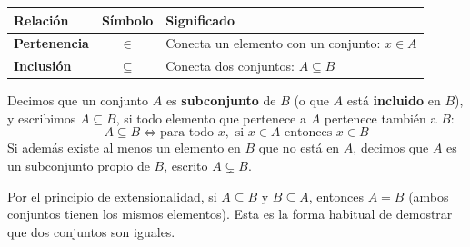 \begin{center}
\begin{tabular}{|l|c|l|}
\hline
\textbf{Relación} & \textbf{Símbolo} & \textbf{Significado} \\
\hline
\textbf{Pertenencia} & $\in$ & Conecta un elemento con un conjunto: $x \in A$ \\
\textbf{Inclusión} & $\subseteq$ & Conecta dos conjuntos: $A \subseteq B$ \\
\hline
\end{tabular}
\end{center}

\begin{definicion}[Subconjunto]
Decimos que un conjunto $A$ es \textbf{subconjunto} de $B$ (o que $A$ está \textbf{incluido} en $B$), y escribimos $A \subseteq B$, si todo elemento que pertenece a $A$ pertenece también a $B$:
\[
A \subseteq B \iff \text{para todo } x, \text{ si } x \in A \text{ entonces } x \in B
\]
Si además existe al menos un elemento en $B$ que no está en $A$, decimos que $A$ es un subconjunto propio de $B$, escrito $A \subsetneq B$.
\end{definicion}
Por el principio de extensionalidad, si $A \subseteq B$ y $B \subseteq A$,
entonces $A = B$ (ambos conjuntos tienen los mismos elementos). Esta es la
forma habitual de demostrar que dos conjuntos son iguales. 

